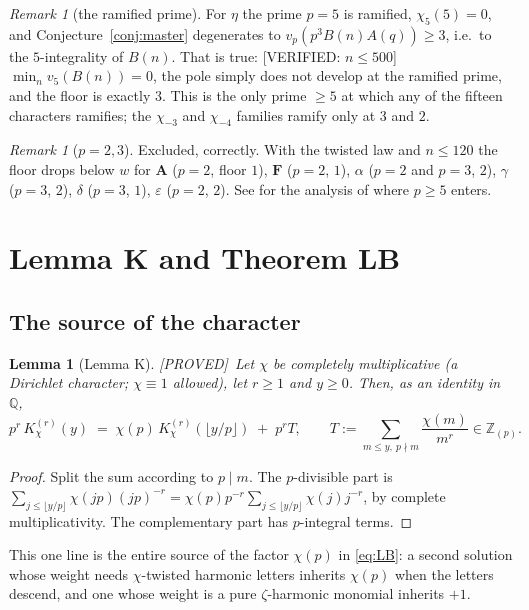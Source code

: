 \documentclass[11pt,reqno]{amsart}
\theoremstyle{plain}
\newtheorem{lemma}[theorem]{Lemma}
\theoremstyle{definition}
\theoremstyle{remark}
\newtheorem{remark}[theorem]{Remark}
\newcommand{\Z}{\mathbb{Z}}
\newcommand{\Q}{\mathbb{Q}}
\newcommand{\Zp}{\Z_{(p)}}
\newcommand{\vp}{v_p}
\newcommand{\KK}[3]{K^{(#1)}_{#2}\!\left(#3\right)}
\newcommand{\Proved}{\textup{\textsf{[PROVED]}}}
\newcommand{\VerifiedR}[1]{\textup{\textsf{[VERIFIED: #1]}}}
\numberwithin{equation}{section}
\begin{document}
\begin{remark}[the ramified prime]\label{rem:ramified}
For $\eta$ the prime $p=5$ is ramified, $\chi_5(5)=0$, and Conjecture~\ref{conj:master}
degenerates to $\vp(p^3B(n)A(q))\ge3$, i.e.\ to the $5$-integrality of $B(n)$. That is
true: \VerifiedR{$n\le500$} $\min_n v_5(B(n))=0$, the pole simply does not develop at the
ramified prime, and the floor is exactly $3$. This is the only prime $\ge5$ at which any of
the fifteen characters ramifies; the $\chi_{-3}$ and $\chi_{-4}$ families ramify only at
$3$ and $2$.
\end{remark}

\begin{remark}[$p=2,3$]
Excluded, correctly. With the twisted law and $n\le120$ the floor drops below $w$ for
$\mathbf A$ ($p=2$, floor $1$), $\mathbf F$ ($p=2$, $1$), $\alpha$ ($p=2$ and $p=3$, $2$),
$\gamma$ ($p=3$, $2$), $\delta$ ($p=3$, $1$), $\varepsilon$ ($p=2$, $2$). See
\cite[\S8]{CompanionLucas2nd} for the analysis of where $p\ge5$ enters.
\end{remark}

\section{Lemma K and Theorem LB}\label{sec:LB}

\subsection{The source of the character}
\begin{lemma}[Lemma K]\label{lem:K}
\Proved\ Let $\chi$ be completely multiplicative (a Dirichlet character; $\chi\equiv1$
allowed), let $r\ge1$ and $y\ge0$. Then, as an identity in $\Q$,
\[
  p^{r}\,\KK r\chi y \;=\; \chi(p)\,\KK r\chi{\lfloor y/p\rfloor}\;+\;p^{r}T,
  \qquad T:=\sum_{m\le y,\ p\nmid m}\frac{\chi(m)}{m^{r}}\in\Zp .
\]
\end{lemma}

\begin{proof}
Split the sum according to $p\mid m$. The $p$-divisible part is
$\sum_{j\le\lfloor y/p\rfloor}\chi(jp)(jp)^{-r}
 =\chi(p)p^{-r}\sum_{j\le\lfloor y/p\rfloor}\chi(j)j^{-r}$, by complete multiplicativity.
The complementary part has $p$-integral terms.
\end{proof}

This one line is the entire source of the factor $\chi(p)$ in \eqref{eq:LB}: a second
solution whose weight needs $\chi$-twisted harmonic letters inherits $\chi(p)$ when the
letters descend, and one whose weight is a pure $\zeta$-harmonic monomial inherits $+1$.
\end{document}
